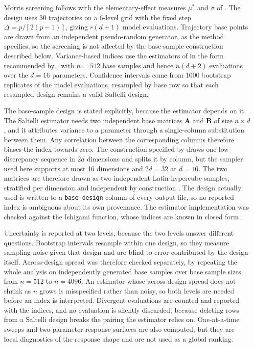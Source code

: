 Morris screening follows \citet{Morris1991} with the elementary-effect measures
$\mu^\ast$ and $\sigma$ of \citet{Campolongo2007}. The design uses 30
trajectories on a 6-level grid with the fixed step $\Delta = p/[2(p-1)]$, giving
$r(d+1)$ model evaluations. Trajectory base points are drawn from an
independent pseudo-random generator, as the method specifies, so the screening
is not affected by the base-sample construction described below. Variance-based
indices use the estimators of \citet{Sobol2001} in the form recommended by
\citet{Saltelli2010}, with $n=512$ base samples and hence $n(d+2)$ evaluations
over the $d=16$ parameters. Confidence intervals come from 1000 bootstrap
replicates of the model evaluations, resampled by base row so that each
resampled design remains a valid Saltelli design.

The base-sample design is stated explicitly, because the estimator depends on
it. The Saltelli estimator needs two independent base matrices $\mathbf{A}$ and
$\mathbf{B}$ of size $n \times d$, and it attributes variance to a parameter
through a single-column substitution between them. Any correlation between the
corresponding columns therefore biases the index towards zero. The construction
specified by \citet{Saltelli2010} draws one low-discrepancy sequence in $2d$
dimensions and splits it by column, but the sampler used here supports at most
16 dimensions and $2d=32$ at $d=16$. The two matrices are therefore drawn as two
independent Latin-hypercube samples, stratified per dimension and independent by
construction \citep{McKay1979}. The design actually used is written to a
\texttt{base\_design} column of every output file, so no reported index is
ambiguous about its own provenance. The estimator implementation was checked
against the Ishigami function, whose indices are known in closed form
\citep{Ishigami1990}.

Uncertainty is reported at two levels, because the two levels answer different
questions. Bootstrap intervals resample within one design, so they measure
sampling noise given that design and are blind to error contributed by the
design itself. Across-design spread was therefore checked separately, by
repeating the whole analysis on independently generated base samples over base
sample sizes from $n=512$ to $n=4096$. An estimator whose across-design spread
does not shrink as $n$ grows is misspecified rather than noisy, so both levels
are needed before an index is interpreted. Divergent evaluations are counted and
reported with the indices, and no evaluation is silently discarded, because
deleting rows from a Saltelli design breaks the pairing the estimator relies on.
One-at-a-time sweeps and two-parameter response surfaces are also computed, but
they are local diagnostics of the response shape and are not used as a global
ranking.
